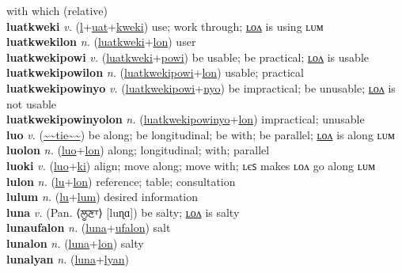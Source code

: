 with which (relative) \label{luat} \\
\textbf{luatkweki} \textit{v.} (\hyperref[l]{l}+\hyperref[uat]{uat}+\hyperref[kweki]{kweki})
use; work through; \hyperref[luatkwekilon]{ʟᴏᴧ} is using ʟᴜᴍ \label{luatkweki} \\
\textbf{luatkwekilon} \textit{n.} (\hyperref[luatkweki]{luatkweki}+\hyperref[lon]{lon})
user \label{luatkwekilon} \\
\textbf{luatkwekipowi} \textit{v.} (\hyperref[luatkweki]{luatkweki}+\hyperref[powi]{powi})
be usable; be practical; \hyperref[luatkwekipowilon]{ʟᴏᴧ} is usable \label{luatkwekipowi} \\
\textbf{luatkwekipowilon} \textit{n.} (\hyperref[luatkwekipowi]{luatkwekipowi}+\hyperref[lon]{lon})
usable; practical \label{luatkwekipowilon} \\
\textbf{luatkwekipowinyo} \textit{v.} (\hyperref[luatkwekipowi]{luatkwekipowi}+\hyperref[nyo]{nyo})
be impractical; be unusable; \hyperref[luatkwekipowinyolon]{ʟᴏᴧ} is not usable \label{luatkwekipowinyo} \\
\textbf{luatkwekipowinyolon} \textit{n.} (\hyperref[luatkwekipowinyo]{luatkwekipowinyo}+\hyperref[lon]{lon})
impractical; unusable \label{luatkwekipowinyolon} \\
\textbf{luo} \textit{v.} (\hyperref[tie]{\~{}\~{}tie\~{}\~{}})
be along; be longitudinal; be with; be parallel; \hyperref[luolon]{ʟᴏᴧ} is along ʟᴜᴍ \label{luo} \\
\textbf{luolon} \textit{n.} (\hyperref[luo]{luo}+\hyperref[lon]{lon})
along; longitudinal; with; parallel \label{luolon} \\
\textbf{luoki} \textit{v.} (\hyperref[luo]{luo}+\hyperref[ki]{ki})
align; move along; move with; ʟєꜱ makes ʟᴏᴧ go along ʟᴜᴍ \label{luoki} \\
\textbf{lulon} \textit{n.} (\hyperref[lu]{lu}+\hyperref[lon]{lon})
reference; table; consultation \label{lulon} \\
\textbf{lulum} \textit{n.} (\hyperref[lu]{lu}+\hyperref[lum]{lum})
desired information \label{lulum} \\
\textbf{luna} \textit{v.} (Pan. ⟨ਲੂਣਾ⟩ [luɳɑ])
be salty; \hyperref[lunalon]{ʟᴏᴧ} is salty \label{luna} \\
\textbf{lunaufalon} \textit{n.} (\hyperref[luna]{luna}+\hyperref[ufalon]{ufalon})
salt \label{lunaufalon} \\
\textbf{lunalon} \textit{n.} (\hyperref[luna]{luna}+\hyperref[lon]{lon})
salty \label{lunalon} \\
\textbf{lunalyan} \textit{n.} (\hyperref[luna]{luna}+\hyperref[lyan]{lyan})
